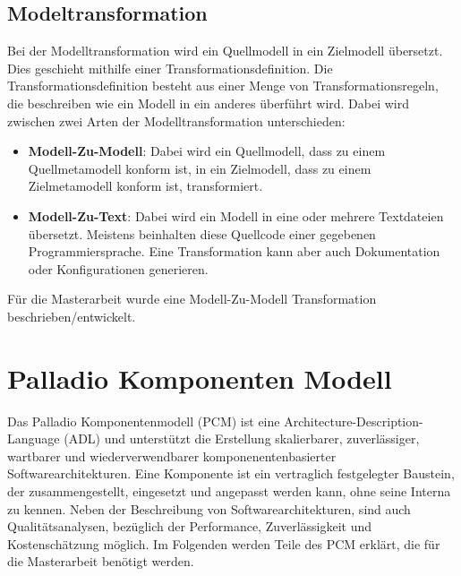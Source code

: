 \subsection{Modeltransformation}
Bei der Modelltransformation \cite{Kleppe03} wird ein Quellmodell in ein Zielmodell übersetzt. Dies geschieht mithilfe einer Transformationsdefinition. Die Transformationsdefinition besteht aus einer Menge von Transformationsregeln, die beschreiben wie ein Modell in ein anderes überführt wird. Dabei wird zwischen zwei Arten der Modelltransformation unterschieden:
\begin{itemize}
    \item \textbf{Modell-Zu-Modell}: Dabei wird ein Quellmodell, dass zu einem Quellmetamodell konform ist, in ein Zielmodell, dass zu einem Zielmetamodell konform ist, transformiert.
    \item \textbf{Modell-Zu-Text}: Dabei wird ein Modell in eine oder mehrere Textdateien übersetzt. Meistens beinhalten diese Quellcode einer gegebenen Programmiersprache. Eine Transformation kann aber auch Dokumentation oder Konfigurationen generieren.
\end{itemize}
Für die Masterarbeit wurde eine Modell-Zu-Modell Transformation beschrieben/entwickelt.
\section{Palladio Komponenten Modell}
\label{sec:palladio}
Das Palladio Komponentenmodell (PCM) \cite{palladio17} ist eine Architecture-Description-Language (ADL) und unterstützt die Erstellung skalierbarer, zuverlässiger, wartbarer und wiederverwendbarer komponenentenbasierter Softwarearchitekturen. Eine Komponente ist ein vertraglich festgelegter Baustein, der zusammengestellt, eingesetzt und angepasst werden kann, ohne seine Interna zu kennen. Neben der Beschreibung von Softwarearchitekturen, sind auch Qualitätsanalysen, bezüglich der Performance, Zuverlässigkeit und Kostenschätzung möglich. Im Folgenden werden Teile des PCM erklärt, die für die Masterarbeit benötigt werden.

